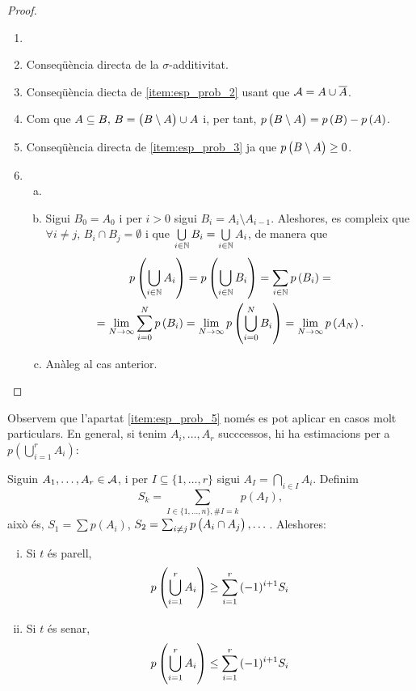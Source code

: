 \begin{proof}
    \begin{enumerate}
        \item[]
        \item Conseqüència directa de la $\sigma$-additivitat.
        \item Conseqüència diecta de \ref{item:esp_prob_2} usant que $\mathcal{A} = A\cup \overline{A}$.
        \item Com que $A\subseteq B,\, B=\left( B\setminus A\right) \cup A$ i, per tant, $p\left( B\setminus A \right) = p\left( B\right) - p\left( A\right)$.
        \item Conseqüència directa de \ref{item:esp_prob_3} ja que $p\left( B\setminus A\right)\geq 0$.
        \item 
        \begin{enumerate}[a)]
            \item[]
            \item Sigui $B_0=A_0$ i per $i>0$ sigui $B_i = A_i\setminus A_{i-1}$. Aleshores, es compleix que $\forall i\neq j, \, B_i \cap B_j =\emptyset$ i que $\bigcup\limits_{i\in \mathbb{N}} B_i = \bigcup\limits_{i\in\mathbb{N}} A_i$, de manera que
            \begin{gather*}
                p\left(\bigcup\limits_{i\in\mathbb{N}} A_i\right) = p\left(\bigcup\limits_{i\in\mathbb{N}} B_i\right) = \sum\limits_{i\in\mathbb{N}} p\left( B_i\right) =\\
                = \lim\limits_{N\to\infty} \sum_{i=0}^N p\left( B_i\right) = \lim\limits_{N\to\infty} p\left( \bigcup_{i=0}^N B_i\right) = \lim\limits_{N\to\infty} p\left( A_N\right).
            \end{gather*}
            \item Anàleg al cas anterior.
        \end{enumerate}
    \end{enumerate}
\end{proof}

Observem que l'apartat \ref{item:esp_prob_5} només es pot aplicar en casos molt particulars. En general, si tenim $A_i,\dots,A_r$ succcessos,
hi ha estimacions per a $p(\bigcup_{i=1}^{r}{A_i})$:

\begin{specialteo}
    Siguin $A_1,\dots,A_r\in\mathcal{A}$, i per $I\subseteq\{1,\dots,r\}$ sigui $A_I = \bigcap\limits_{i \in I}{A_i}$. Definim
    \[
        S_k = \sum_{I \in \{1,\dots,n\},\#I=k}{p(A_I)},
    \]
    això és, $S_1 = \sum{p(A_i)}$, $S_2 = \sum_{i \neq j}p\left( A_i \cap A_j\right),\dots$. Aleshores:
    \begin{enumerate}[i)]
         \item Si $t$ és parell,
            \[p\left(\bigcup_{i=1}^{r}{A_i}\right) \geq \sum_{i=1}^{r}{(-1)^{i+1}S_i}\]
         \item Si $t$ és senar,
            \[p\left(\bigcup_{i=1}^{r}{A_i}\right) \leq \sum_{i=1}^{r}{(-1)^{i+1}S_i}\]
    \end{enumerate}
\end{specialteo}

